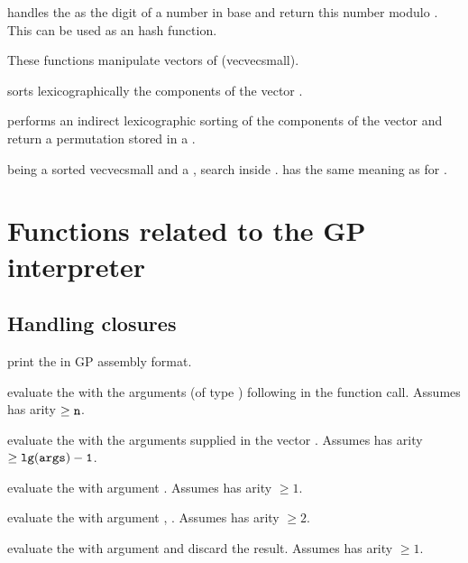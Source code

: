  handles the
  as the digit of a number in base  and return
this number modulo . This can be used as an hash function.

These functions manipulate vectors of  (vecvecsmall).

 sorts lexicographically the components of
the vector .

 performs an indirect lexicographic sorting of the components of the vector  and return a permutation stored in a .

  being a sorted
vecvecsmall and  a , search  inside .  has the same meaning as for .


\newpage
\chapter{Functions related to the GP interpreter}

\section{Handling closures}


 print the   in
GP assembly format.

 evaluate the 
 with the  arguments (of type ) following  in
the function call. Assumes  has arity $\geq {\tt n}$.

 evaluate the 
 with the arguments supplied in the vector . Assumes 
has arity $\geq {\tt lg(args)-1}$.

 evaluate the 
 with argument . Assumes  has arity $\geq 1$.

 evaluate the 
 with argument , . Assumes  has arity $\geq 2$.

 evaluate the 
 with argument  and discard the result. Assumes 
has arity $\geq 1$.

